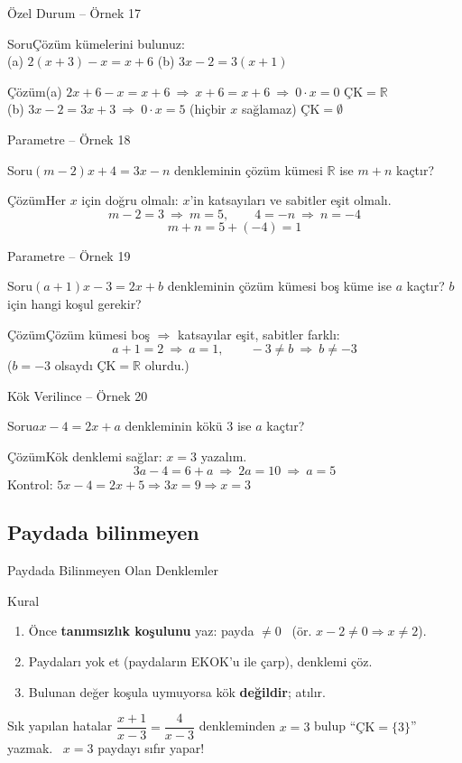 \documentclass[aspectratio=169,11pt,handout]{beamer}
\newcommand{\soru}[3]{%
\begin{frame}{#1}
  \begin{block}{Soru}\large #2\end{block}
  \pause
  \begin{exampleblock}{Çözüm}\large #3\end{exampleblock}
\end{frame}}
\begin{document}
\soru{Özel Durum -- Örnek 17}
{Çözüm kümelerini bulunuz:\\[3pt] (a) \(2(x+3)-x=x+6\) \qquad\qquad (b) \(3x-2=3(x+1)\)}
{(a) \(2x+6-x=x+6\ \Rightarrow\ x+6=x+6\ \Rightarrow\ 0\cdot x=0\) \quad \(\text{ÇK}=\mathbb{R}\)\\[4pt]
(b) \(3x-2=3x+3\ \Rightarrow\ 0\cdot x=5\) \quad (hiçbir \(x\) sağlamaz) \quad \(\text{ÇK}=\emptyset\)}

\soru{Parametre -- Örnek 18}
{\((m-2)x+4=3x-n\) denkleminin çözüm kümesi \(\mathbb{R}\) ise \(m+n\) kaçtır?}
{Her \(x\) için doğru olmalı: \(x\)'in katsayıları ve sabitler eşit olmalı.
\[m-2=3\ \Rightarrow\ m=5,\qquad 4=-n\ \Rightarrow\ n=-4\]
\[m+n=5+(-4)=1\]}

\soru{Parametre -- Örnek 19}
{\((a+1)x-3=2x+b\) denkleminin çözüm kümesi boş küme ise \(a\) kaçtır? \(b\) için hangi koşul gerekir?}
{Çözüm kümesi boş \(\Rightarrow\) katsayılar eşit, sabitler farklı:
\[a+1=2\ \Rightarrow\ a=1,\qquad -3\neq b\ \Rightarrow\ b\neq-3\]
(\(b=-3\) olsaydı \(\text{ÇK}=\mathbb{R}\) olurdu.)}

\soru{Kök Verilince -- Örnek 20}
{\(ax-4=2x+a\) denkleminin kökü \(3\) ise \(a\) kaçtır?}
{Kök denklemi sağlar: \(x=3\) yazalım.
\[3a-4=6+a\ \Rightarrow\ 2a=10\ \Rightarrow\ a=5\]
Kontrol: \(5x-4=2x+5\Rightarrow 3x=9\Rightarrow x=3\) \checkmark}

\subsection{Paydada bilinmeyen}
\begin{frame}{Paydada Bilinmeyen Olan Denklemler}
\begin{block}{Kural}
\begin{enumerate}
\item Önce \textbf{tanımsızlık koşulunu} yaz: payda \(\neq 0\) \ (ör. \(x-2\neq 0\Rightarrow x\neq 2\)).
\item Paydaları yok et (paydaların EKOK'u ile çarp), denklemi çöz.
\item Bulunan değer koşula uymuyorsa kök \textbf{değildir}; atılır.
\end{enumerate}
\end{block}
\begin{alertblock}{Sık yapılan hatalar}
\(\dfrac{x+1}{x-3}=\dfrac{4}{x-3}\) denkleminden \(x=3\) bulup ``\(\text{ÇK}=\{3\}\)'' yazmak. \ \(x=3\) paydayı sıfır yapar!
\end{alertblock}
\end{frame}
\end{document}

